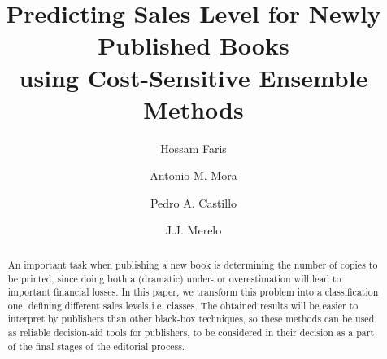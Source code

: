 \documentclass[a4paper,10pt,onecolumn,preprint,3p]{elsarticle}
\begin{document}
\begin{frontmatter}

\title{Predicting Sales Level for Newly Published Books \\
using Cost-Sensitive Ensemble Methods}


\author[abd]{Hossam Faris}
\author[ugratc]{Antonio M. Mora}
\author[ugratc]{Pedro A. Castillo}
\author[ugratc]{J.J. Merelo}


\address[abd]{Business Information Technology Department, King Abdullah II School for Information Technology \\
The University of Jordan, Amman, Jordan}
\address[ugratc]{Department of Computer Architecture and Computer Technology, ETSIIT and CITIC \\
University of Granada, Granada, Spain}


\begin{abstract}
An important task when publishing a new book is determining the number 
of copies to be printed, since doing both a (dramatic) under- or overestimation will lead to important financial losses.
In this paper, we transform this problem into a classification one, defining different sales levels i.e. classes. 
The obtained results will be easier to interpret by publishers than other black-box techniques, 
so these methods can be used as reliable decision-aid tools for publishers, to be considered in their decision as a part of the final stages of the editorial process.


\end{abstract}
\end{frontmatter}
\end{document}
